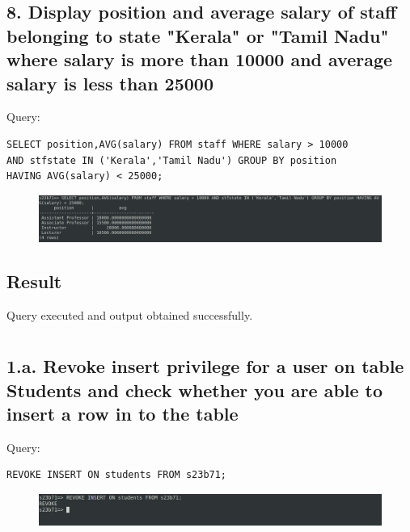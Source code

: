 \documentclass{article}
\begin{document}
\subsection*{8. Display position and average salary of staff belonging to state "Kerala" or "Tamil Nadu" where salary is more than 10000 and average salary is less than 25000}
Query:
\begin{Verbatim}[frame=single,framerule=1pt,fontfamily=courier,fontsize=\small]
SELECT position,AVG(salary) FROM staff WHERE salary > 10000 
AND stfstate IN ('Kerala','Tamil Nadu') GROUP BY position 
HAVING AVG(salary) < 25000;
\end{Verbatim}
\begin{figure}[H]
    \centering
    \includegraphics[width=\textwidth]{cycle3/3.8.png}
\end{figure}

\subsection*{Result}
Query executed and output obtained successfully.

\newpage
\section*{}

\subsection*{1.a. Revoke insert privilege for a user on table Students and check whether you are able to insert a row in to the table}
Query:
\begin{Verbatim}[frame=single,framerule=1pt,fontfamily=courier,fontsize=\small]
REVOKE INSERT ON students FROM s23b71;
\end{Verbatim}
\begin{figure}[H]
    \centering
    \includegraphics[width=\textwidth]{cycle4/4.1.1.png}
\end{figure}
\end{document}

